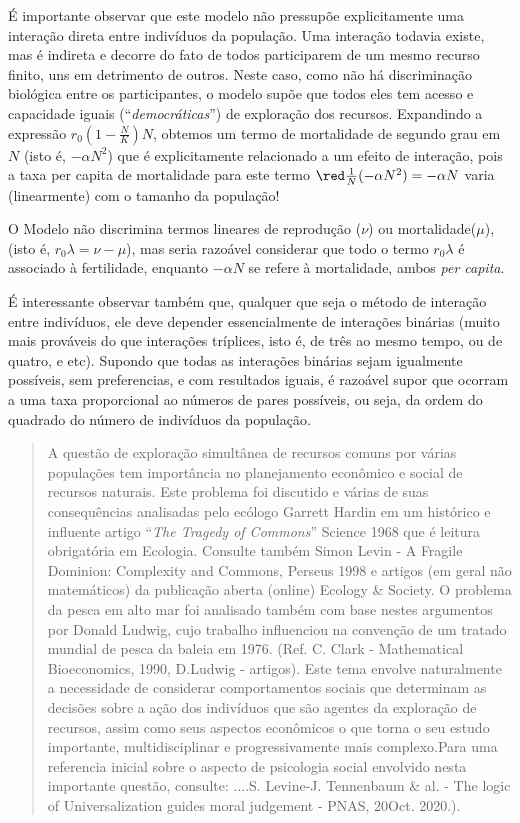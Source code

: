     É importante observar que este modelo não pressupõe explicitamente uma interação direta entre indivíduos da população. Uma interação todavia existe, mas é indireta e decorre do fato de todos participarem de um mesmo recurso finito, uns em detrimento de outros. Neste caso, como não há discriminação biológica entre os participantes, o modelo supõe que todos eles tem acesso e capacidade iguais (``\textit{democráticas}'') de exploração dos recursos. Expandindo a expressão \(r_0 (1-\frac{N}{K})N\), obtemos um termo de mortalidade de segundo grau em \(N\) (isto é, \(-\alpha N^2\)) que é explicitamente relacionado a um efeito de interação, pois a taxa per capita de mortalidade para este termo \(\red \frac{1}{N} (-\alpha N^2) = -\alpha N\) varia (linearmente) com o tamanho da população!

    O Modelo não discrimina termos lineares de reprodução (\(\nu\)) ou mortalidade(\(\mu\)), (isto é, \(r_0 \lambda = \nu - \mu\)), mas seria razoável considerar que todo o termo \(r_0\lambda\) é associado à fertilidade, enquanto \(-\alpha N\) se refere à mortalidade, ambos \textit{per capita}.

    É interessante observar também que, qualquer que seja o método de interação entre indivíduos, ele deve depender essencialmente de interações binárias (muito mais prováveis do que interações tríplices, isto é, de três ao mesmo tempo, ou de quatro, e etc). Supondo que todas as interações binárias sejam igualmente possíveis, sem preferencias, e com resultados iguais, é razoável supor que ocorram a uma taxa proporcional ao números de pares possíveis, ou seja, da ordem do quadrado do número de indivíduos da população.

\begin{quotation}
    A questão de exploração simultânea de recursos comuns por várias populações tem importância no planejamento econômico e social de recursos naturais. Este problema foi discutido e várias de suas consequências analisadas pelo ecólogo Garrett Hardin em um histórico e influente artigo ``\textit{The Tragedy of Commons}'' Science 1968 que é leitura  obrigatória em Ecologia. Consulte também Simon Levin - A Fragile Dominion: Complexity and Commons, Perseus 1998 e artigos (em geral não matemáticos) da publicação aberta (online) Ecology \& Society. O problema da pesca em alto mar foi analisado também com base nestes argumentos por Donald Ludwig, cujo trabalho influenciou na convenção de um tratado mundial de pesca da baleia em 1976. (Ref. C. Clark - Mathematical Bioeconomics, 1990, D.Ludwig - artigos). Este tema envolve naturalmente a necessidade de considerar comportamentos sociais que determinam as decisões sobre a ação dos indivíduos que são agentes da exploração de recursos, assim como seus aspectos econômicos o que torna o seu estudo importante, multidisciplinar e progressivamente mais complexo.Para uma referencia inicial sobre o aspecto de psicologia social envolvido nesta importante questão, consulte: ....S. Levine-J. Tennenbaum \& al. - The logic of Universalization guides moral judgement - PNAS, 20Oct. 2020.).
\end{quotation}

